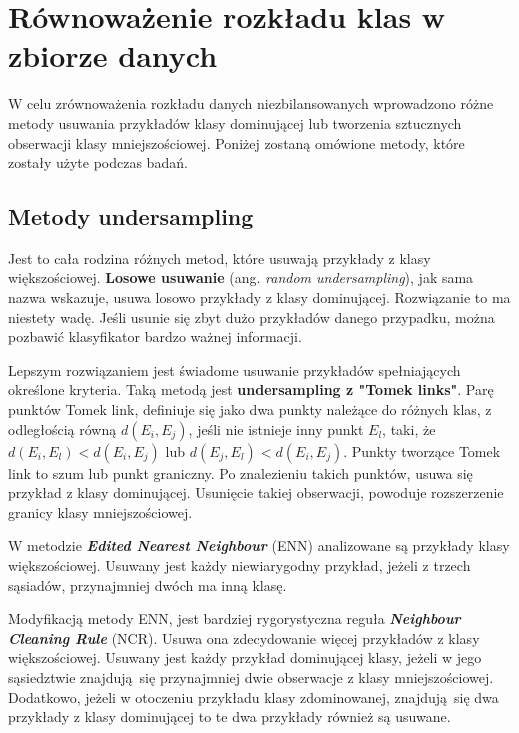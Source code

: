\section{Równoważenie rozkładu klas w zbiorze danych}
\label{rozdzialopissamplingu}
W celu zrównoważenia rozkładu danych niezbilansowanych wprowadzono różne metody usuwania przykładów klasy dominującej lub tworzenia sztucznych obserwacji klasy mniejszościowej. Poniżej zostaną omówione metody, które zostały użyte podczas badań.
\subsection{Metody undersampling}
Jest to cała rodzina różnych metod, które usuwają przykłady z klasy większościowej. \textbf{Losowe usuwanie} (ang. \textit{random undersampling}), jak sama nazwa wskazuje, usuwa losowo przykłady z klasy dominującej. Rozwiązanie to ma niestety wadę. Jeśli usunie się zbyt dużo przykładów danego przypadku, można pozbawić klasyfikator bardzo ważnej informacji. \par
Lepszym rozwiązaniem jest świadome usuwanie przykładów spełniających określone kryteria. Taką metodą jest \textbf{undersampling z "Tomek links"}. Parę punktów Tomek link, definiuje się jako dwa punkty należące do różnych klas, z odległością równą $d(E_i,E_j)$, jeśli nie istnieje inny punkt $E_l$, taki, że $d(E_i,E_l) < d(E_i,E_j)$ lub $d(E_j,E_l) < d(E_i,E_j)$. Punkty tworzące Tomek link to szum lub punkt graniczny. Po znalezieniu takich punktów, usuwa się przykład z klasy dominującej. Usunięcie takiej obserwacji, powoduje rozszerzenie granicy klasy mniejszościowej. \par
W metodzie \textbf{\textit{Edited Nearest Neighbour}} (ENN) analizowane są przykłady klasy większościowej. Usuwany jest każdy niewiarygodny przykład, jeżeli z trzech sąsiadów, przynajmniej dwóch ma inną klasę. \par
Modyfikacją metody ENN, jest bardziej rygorystyczna reguła \textbf{\textit{Neighbour Cleaning Rule}} (NCR). Usuwa ona zdecydowanie więcej przykładów z klasy większościowej. Usuwany jest każdy przykład dominującej klasy, jeżeli w jego sąsiedztwie znajdują się przynajmniej dwie obserwacje z klasy mniejszościowej. Dodatkowo, jeżeli w otoczeniu przykładu klasy zdominowanej, znajdują się dwa przykłady z klasy dominującej to te dwa przykłady również są usuwane.

